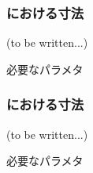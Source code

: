 \subsubsection{\EndFaceBoringMilling における寸法\TBW}
(to be written...)
\begin{Parameter}{必要なパラメタ}
\PMEndFaceBoringAsideDistance%
\PMEndFaceBoringWidth%
\PMEndFaceBoringDepth%
\PMEndFaceBoringCornerR\\
\PMACOD%
\PMBDOD%
\PMEndFaceBoringLength
\end{Parameter}

\subsubsection{\IncutBoringMilling における寸法\TBW}
(to be written...)
\begin{Parameter}{必要なパラメタ}
\PMIncutBoringACWidth%
\PMIncutBoringBDWidth%
\PMIncutBoringCornerR%
\PMIncutBoringLength%
\end{Parameter}


\clearpage
